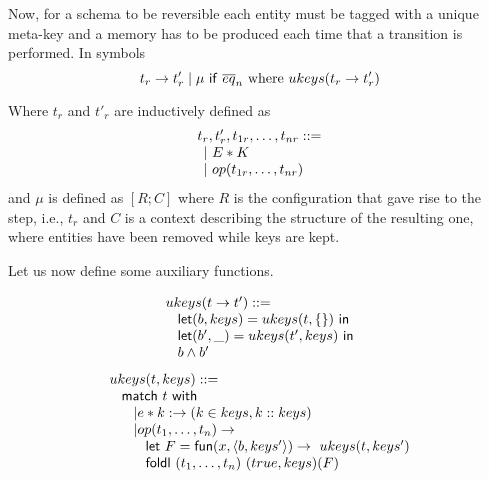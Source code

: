 \documentclass{article}[12pt,a4paper]
\theoremstyle{definition}
\newcommand{\paral}{\;|\;}
\begin{document}
Now, for a schema to be reversible each entity must be tagged with a unique meta-key and a
memory has to be produced each time that a transition is performed. In symbols
\[t_r \rightarrow t'_r \paral \mu ~\ms{if}~\overline{eq}_n~\text{where
  }ukeys(t_r\rightarrow t'_r)\]

Where $t_r$ and $t'_r$ are inductively defined as
\[
  \begin{array}{l}
    t_r,t'_r,t_{1r},\ldots,t_{nr} ::=\\
    \hspace{1ex}|~E*K\\
    \hspace{1ex}|~op(t_{1r},\ldots,t_{nr})\\
  \end{array}
\]
and $\mu$ is defined as $[R;C]$ where $R$ is the configuration that gave rise to
the step, i.e., $t_r$ and $C$ is a context describing the structure of the
resulting one, where entities have been removed while keys are kept.

Let us now define some auxiliary functions.

\[
  \begin{array}{l}
    ukeys(t\rightarrow t') ::=\\
    \hspace{2ex} \mathsf{let}(b,keys)=ukeys(t, \{\})~\mathsf{in}\\
    \hspace{2ex} \mathsf{let}(b',\_)=ukeys(t', keys)~\mathsf{in}\\
    \hspace{2ex} b \wedge b'
  \end{array}
\]
\[
  \begin{array}{l}
    ukeys(t, keys) ::=\\
    \hspace{2ex}\mathsf{match}~t~\mathsf{with}\\
    \hspace{4ex}| e*k: \rightarrow (k\in keys, k::keys)\\
    \hspace{4ex}| op(t_1,\ldots,t_n) \rightarrow \\
    \hspace{6ex} \mathsf{let}~F=\mathsf{fun}(x,\langle b, keys'\rangle)\rightarrow~ukeys(t,keys')\\
    \hspace{6ex} \mathsf{foldl}~(t_1,\ldots,t_n)~(true, keys)(F)
  \end{array}
\]
\end{document}
